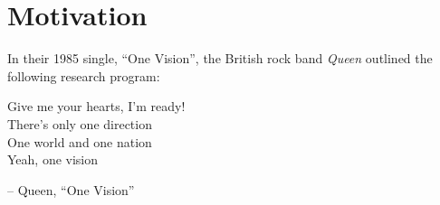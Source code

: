 \setcounter{section}{0}

\section{Motivation}

In their 1985 single, \enquote{One Vision}, 
the British rock band \textit{Queen} outlined the 
following research program:
\begin{center}
  Give me your hearts, I'm ready!\\
  There's only one direction\\
  One world and one nation\\
  Yeah, one vision
\end{center}
\begin{flushright}
  \small{
  -- Queen, ``One Vision''}
\end{flushright}
%
